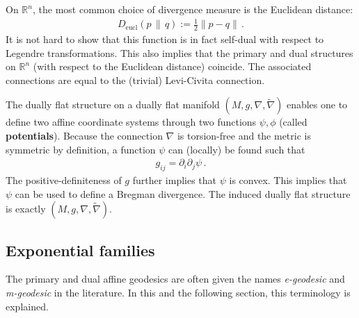     \begin{example}
        On $\mathbb{R}^n$, the most common choice of divergence measure is the Euclidean distance:
        \begin{gather}
            D_{\text{eucl}}(p\,\|\,q) := \frac{1}{2}\|p-q\|\,.
        \end{gather}
        It is not hard to show that this function is in fact self-dual with respect to Legendre transformations. This also implies that the primary and dual structures on $\mathbb{R}^n$ (with respect to the Euclidean distance) coincide. The associated connections are equal to the (trivial) Levi-Civita connection.
    \end{example}

    \begin{property}
        The dually flat structure on a dually flat manifold $(M,g,\nabla,\widetilde{\nabla})$ enables one to define two affine coordinate systems through two functions $\psi,\phi$ (called \textbf{potentials}). Because the connection $\nabla$ is torsion-free and the metric is symmetric by definition, a function $\psi$ can (locally) be found such that
        \begin{gather}
            g_{ij} = \partial_i\partial_j\psi\,.
        \end{gather}
        The positive-definiteness of $g$ further implies that $\psi$ is convex. This implies that $\psi$ can be used to define a Bregman divergence. The induced dually flat structure is exactly $(M,g,\nabla,\widetilde{\nabla})$.
    \end{property}

\subsection{Exponential families}

    The primary and dual affine geodesics are often given the names \textit{e-geodesic} and \textit{m-geodesic} in the literature. In this and the following section, this terminology is explained.

